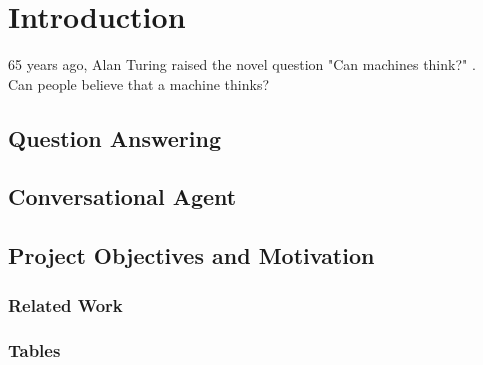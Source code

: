 \chapter{Introduction}
\label{chapter:intro}

65 years ago, Alan Turing raised the novel question "Can machines think?" \cite{Turing1950}.
\\
Can people believe that a machine thinks?

\section{Question Answering}
\label{sec:qa}

\section{Conversational Agent}
\label{sec:conversational-agent}

\section{Project Objectives and Motivation}
\label{sec:proj}




\subsection{Related Work}


\subsection{Tables}
\begin{comment}
We can also have tables... like \labelindexref{Table}{table:reports}.

\begin{center}
\begin{table}[htb]
  \caption{Generated reports - associated Makefile targets and scripts}
  \begin{tabular}{l*{6}{c}r}
    Generated report & Makefile target & Script \\
    \hline
    Full Test Specification & full_spec & generate_all_spec.py  \\
    Test Report & test_report & generate_report.py  \\
    Requirements Coverage & requirements_coverage &
    generate_requirements_coverage.py   \\
    API Coverage & api_coverage & generate_api_coverage.py  \\
  \end{tabular}
  \label{table:reports}
\end{table}
\end{center}
\end{comment}

